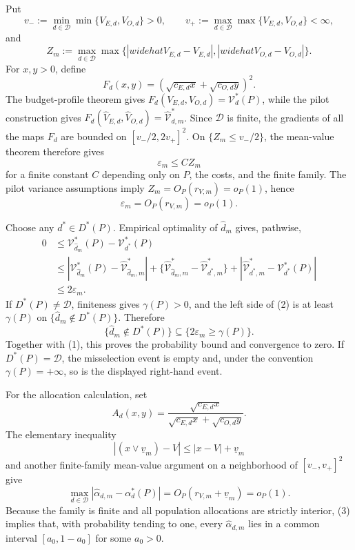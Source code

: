 Put
\[
 v_-:=\min_{d\in\mathcal D}\min\{V_{E,d},V_{O,d}\}>0,
 \qquad
 v_+:=\max_{d\in\mathcal D}\max\{V_{E,d},V_{O,d}\}<\infty,
\]
and
\[
 Z_m:=\max_{d\in\mathcal D}\max\{|widehat V_{E,d}-V_{E,d}|,
 |widehat V_{O,d}-V_{O,d}|\}.
\]
For \(x,y>0\), define
\[
 F_d(x,y)=(\sqrt{c_{E,d}x}+\sqrt{c_{O,d}y})^2.
\]
The budget-profile theorem gives \(F_d(V_{E,d},V_{O,d})=\mathcal V_d^*(P)\), while the pilot construction gives
\(F_d(\widehat V_{E,d},\widehat V_{O,d})=\widehat{\mathcal V}_{d,m}^*\).  Since \(\mathcal D\) is finite, the gradients of all the maps \(F_d\) are bounded on \([v_-/2,2v_+]^2\).  On \(\{Z_m\le v_-/2\}\), the mean-value theorem therefore gives
\[
 \varepsilon_m\le C Z_m
\]
for a finite constant \(C\) depending only on \(P\), the costs, and the finite family.  The pilot variance assumptions imply \(Z_m=O_P(r_{V,m})=o_P(1)\), hence
\[
 \varepsilon_m=O_P(r_{V,m})=o_P(1). \tag{1}
\]

Choose any \(d^*\in D^*(P)\).  Empirical optimality of \(\widehat d_m\) gives, pathwise,
\[
\begin{aligned}
0&\le \mathcal V_{\widehat d_m}^*(P)-\mathcal V_{d^*}^*(P)\\
&\le |\mathcal V_{\widehat d_m}^*(P)-\widehat{\mathcal V}_{\widehat d_m,m}^*|
 +\{\widehat{\mathcal V}_{\widehat d_m,m}^*-
       \widehat{\mathcal V}_{d^*,m}^*\}
 +|\widehat{\mathcal V}_{d^*,m}^*-\mathcal V_{d^*}^*(P)|\\
&\le2\varepsilon_m. 
\end{aligned} \tag{2}
\]
If \(D^*(P)\ne\mathcal D\), finiteness gives \(\gamma(P)>0\), and the left side of (2) is at least \(\gamma(P)\) on \(\{\widehat d_m\notin D^*(P)\}\).  Therefore
\[
 \{\widehat d_m\notin D^*(P)\}
 \subseteq\{2\varepsilon_m\ge\gamma(P)\}.
\]
Together with (1), this proves the probability bound and convergence to zero.  If \(D^*(P)=\mathcal D\), the misselection event is empty and, under the convention \(\gamma(P)=+\infty\), so is the displayed right-hand event.

For the allocation calculation, set
\[
 A_d(x,y)=\frac{\sqrt{c_{E,d}x}}
 {\sqrt{c_{E,d}x}+\sqrt{c_{O,d}y}}.
\]
The elementary inequality
\[
 |(x\vee\underline v_m)-V|\le |x-V|+\underline v_m
\]
and another finite-family mean-value argument on a neighborhood of \([v_-,v_+]^2\) give
\[
 \max_{d\in\mathcal D}|\widehat\alpha_{d,m}-\alpha_d^*(P)|
 =O_P(r_{V,m}+\underline v_m)=o_P(1). \tag{3}
\]
Because the family is finite and all population allocations are strictly interior, (3) implies that, with probability tending to one, every \(\widehat\alpha_{d,m}\) lies in a common interval \([a_0,1-a_0]\) for some \(a_0>0\).

